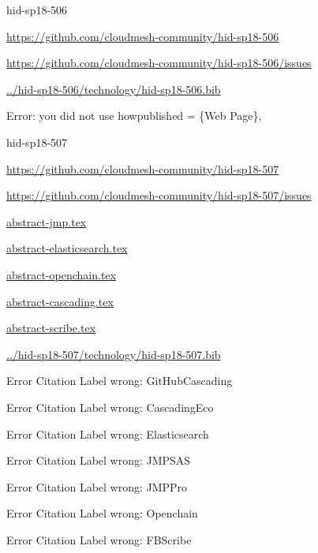 \begin{IU}

hid-sp18-506

\url{https://github.com/cloudmesh-community/hid-sp18-506}

\url{https://github.com/cloudmesh-community/hid-sp18-506/issues}

\href{https://github.com/cloudmesh-community/hid-sp18-506/blob/master//technology/hid-sp18-506.bib}{../hid-sp18-506/technology/hid-sp18-506.bib}

Error: you did not use howpublished = \{Web Page\},

\end{IU}


\begin{IU}

hid-sp18-507

\url{https://github.com/cloudmesh-community/hid-sp18-507}

\url{https://github.com/cloudmesh-community/hid-sp18-507/issues}

\href{https://github.com/cloudmesh-community/hid-sp18-507/blob/master//technology/abstract-jmp.tex}{abstract-jmp.tex}

\href{https://github.com/cloudmesh-community/hid-sp18-507/blob/master//technology/abstract-elasticsearch.tex}{abstract-elasticsearch.tex}

\href{https://github.com/cloudmesh-community/hid-sp18-507/blob/master//technology/abstract-openchain.tex}{abstract-openchain.tex}

\href{https://github.com/cloudmesh-community/hid-sp18-507/blob/master//technology/abstract-cascading.tex}{abstract-cascading.tex}

\href{https://github.com/cloudmesh-community/hid-sp18-507/blob/master//technology/abstract-scribe.tex}{abstract-scribe.tex}

\href{https://github.com/cloudmesh-community/hid-sp18-507/blob/master//technology/hid-sp18-507.bib}{../hid-sp18-507/technology/hid-sp18-507.bib}

 Error Citation Label wrong: GitHubCascading

 Error Citation Label wrong: CascadingEco

 Error Citation Label wrong: Elasticsearch

 Error Citation Label wrong: JMPSAS

 Error Citation Label wrong: JMPPro

 Error Citation Label wrong: Openchain

 Error Citation Label wrong: FBScribe

\end{IU}


